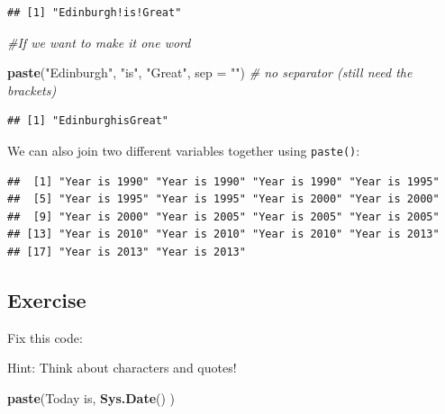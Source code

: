 \documentclass[]{book}
\makeatletter
\newenvironment{Shaded}{\begin{snugshade}}{\end{snugshade}}
\newcommand{\KeywordTok}[1]{\textcolor[rgb]{0.13,0.29,0.53}{\textbf{#1}}}
\newcommand{\DataTypeTok}[1]{\textcolor[rgb]{0.13,0.29,0.53}{#1}}
\newcommand{\StringTok}[1]{\textcolor[rgb]{0.31,0.60,0.02}{#1}}
\newcommand{\CommentTok}[1]{\textcolor[rgb]{0.56,0.35,0.01}{\textit{#1}}}
\newcommand{\OperatorTok}[1]{\textcolor[rgb]{0.81,0.36,0.00}{\textbf{#1}}}
\newcommand{\NormalTok}[1]{#1}
\newenvironment{kframe}{%
\medskip{}
\setlength{\fboxsep}{.8em}
 \def\at@end@of@kframe{}%
 \ifinner\ifhmode%
  \def\at@end@of@kframe{\end{minipage}}%
  \begin{minipage}{\columnwidth}%
 \fi\fi%
 \def\FrameCommand##1{\hskip\@totalleftmargin \hskip-\fboxsep
 \colorbox{shadecolor}{##1}\hskip-\fboxsep
     \hskip-\linewidth \hskip-\@totalleftmargin \hskip\columnwidth}%
 \MakeFramed {\advance\hsize-\width
   \@totalleftmargin\z@ \linewidth\hsize
   \@setminipage}}%
 {\par\unskip\endMakeFramed%
 \at@end@of@kframe}
\renewenvironment{Shaded}{\begin{kframe}}{\end{kframe}}
\makeatother
\begin{document}
\begin{verbatim}
## [1] "Edinburgh!is!Great"
\end{verbatim}

\begin{Shaded}
\begin{Highlighting}[]
\CommentTok{#If we want to make it one word}

\KeywordTok{paste}\NormalTok{(}\StringTok{"Edinburgh"}\NormalTok{, }\StringTok{"is"}\NormalTok{, }\StringTok{"Great"}\NormalTok{, }\DataTypeTok{sep =} \StringTok{""}\NormalTok{) }\CommentTok{# no separator (still need the brackets)}
\end{Highlighting}
\end{Shaded}

\begin{verbatim}
## [1] "EdinburghisGreat"
\end{verbatim}

We can also join two different variables together using
\texttt{paste()}:

\begin{Shaded}
\end{Shaded}

\begin{verbatim}
##  [1] "Year is 1990" "Year is 1990" "Year is 1990" "Year is 1995"
##  [5] "Year is 1995" "Year is 1995" "Year is 2000" "Year is 2000"
##  [9] "Year is 2000" "Year is 2005" "Year is 2005" "Year is 2005"
## [13] "Year is 2010" "Year is 2010" "Year is 2010" "Year is 2013"
## [17] "Year is 2013" "Year is 2013"
\end{verbatim}

\subsection{Exercise}\label{exercise-12}

Fix this code:

Hint: Think about characters and quotes!

\begin{Shaded}
\begin{Highlighting}[]
\KeywordTok{paste}\NormalTok{(Today is, }\KeywordTok{Sys.Date}\NormalTok{() )}
\end{Highlighting}
\end{Shaded}
\end{document}
